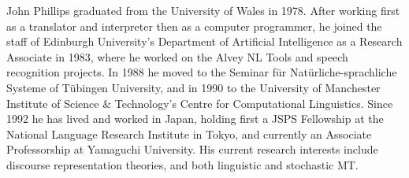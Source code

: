 \begin{biography}

\biotitle{}

{
John Phillips graduated from the University of Wales in 1978.
After working first as a translator and interpreter then
as a computer programmer, he joined the staff of
Edinburgh University's Department of Artificial Intelligence
as a Research Associate in 1983,
where he worked on the Alvey NL Tools and speech recognition projects.
In 1988 he moved to the Seminar f\"ur Nat\"urliche-sprachliche
Systeme of T\"ubingen University,
and in 1990 to the University of Manchester Institute of Science \&
Technology's Centre for Computational Linguistics.
Since 1992 he has lived and worked in Japan, holding first
a JSPS Fellowship at the National Language Research Institute in Tokyo,
and currently an Associate Professorship at Yamaguchi University.
His current research interests include discourse representation
theories, and both linguistic and stochastic MT.
}


\end{biography}


